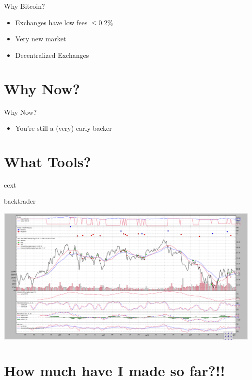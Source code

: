 \documentclass{beamer}
\begin{document}
\begin{frame}{Why Bitcoin?}
  \begin{itemize}
    \item Exchanges have low fees $\leq$0.2\%
    \item Very new market
    \item Decentralized Exchanges
  \end{itemize}
\end{frame}

\section{Why Now?}

\begin{frame}{Why Now?}
  \begin{itemize}
    \item You're still a (very) early backer
  \end{itemize}
\end{frame}

\section{What Tools?}

\begin{frame}{ccxt}
  
\end{frame}

\begin{frame}{backtrader}
    \begin{center}
      \includegraphics[scale=0.21]{images/quickstart}
    \end{center}
\end{frame}

\section{How much have I made so far?!!}
\end{document}
